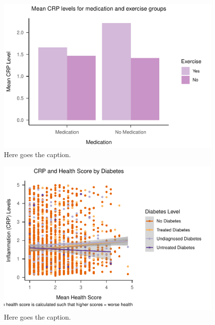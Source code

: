 \documentclass[
  man]{apa6}
\begin{document}
\begin{figure}
\centering
\includegraphics{NEW_Final_Groupof5_files/figure-latex/tableofcrpmedicationandexercise-1.pdf}
\caption{\label{fig:tableofcrpmedicationandexercise}Here goes the caption.}
\end{figure}

\begin{figure}
\centering
\includegraphics{NEW_Final_Groupof5_files/figure-latex/appendix-fig1-1.pdf}
\caption{\label{fig:appendix-fig1}Here goes the caption.}
\end{figure}
\end{document}
